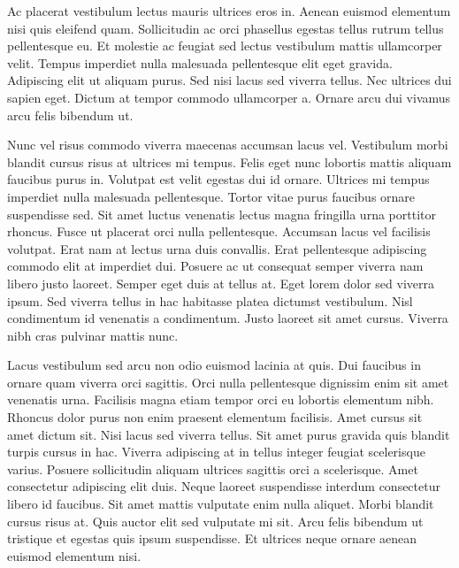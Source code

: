 Ac placerat vestibulum lectus mauris ultrices eros in. Aenean euismod elementum nisi quis eleifend quam. Sollicitudin ac orci phasellus egestas tellus rutrum tellus pellentesque eu. Et molestie ac feugiat sed lectus vestibulum mattis ullamcorper velit. Tempus imperdiet nulla malesuada pellentesque elit eget gravida. Adipiscing elit ut aliquam purus. Sed nisi lacus sed viverra tellus. Nec ultrices dui sapien eget. Dictum at tempor commodo ullamcorper a. Ornare arcu dui vivamus arcu felis bibendum ut.

Nunc vel risus commodo viverra maecenas accumsan lacus vel. Vestibulum morbi blandit cursus risus at ultrices mi tempus. Felis eget nunc lobortis mattis aliquam faucibus purus in. Volutpat est velit egestas dui id ornare. Ultrices mi tempus imperdiet nulla malesuada pellentesque. Tortor vitae purus faucibus ornare suspendisse sed. Sit amet luctus venenatis lectus magna fringilla urna porttitor rhoncus. Fusce ut placerat orci nulla pellentesque. Accumsan lacus vel facilisis volutpat. Erat nam at lectus urna duis convallis. Erat pellentesque adipiscing commodo elit at imperdiet dui. Posuere ac ut consequat semper viverra nam libero justo laoreet. Semper eget duis at tellus at. Eget lorem dolor sed viverra ipsum. Sed viverra tellus in hac habitasse platea dictumst vestibulum. Nisl condimentum id venenatis a condimentum. Justo laoreet sit amet cursus. Viverra nibh cras pulvinar mattis nunc.

Lacus vestibulum sed arcu non odio euismod lacinia at quis. Dui faucibus in ornare quam viverra orci sagittis. Orci nulla pellentesque dignissim enim sit amet venenatis urna. Facilisis magna etiam tempor orci eu lobortis elementum nibh. Rhoncus dolor purus non enim praesent elementum facilisis. Amet cursus sit amet dictum sit. Nisi lacus sed viverra tellus. Sit amet purus gravida quis blandit turpis cursus in hac. Viverra adipiscing at in tellus integer feugiat scelerisque varius. Posuere sollicitudin aliquam ultrices sagittis orci a scelerisque. Amet consectetur adipiscing elit duis. Neque laoreet suspendisse interdum consectetur libero id faucibus. Sit amet mattis vulputate enim nulla aliquet. Morbi blandit cursus risus at. Quis auctor elit sed vulputate mi sit. Arcu felis bibendum ut tristique et egestas quis ipsum suspendisse. Et ultrices neque ornare aenean euismod elementum nisi.

